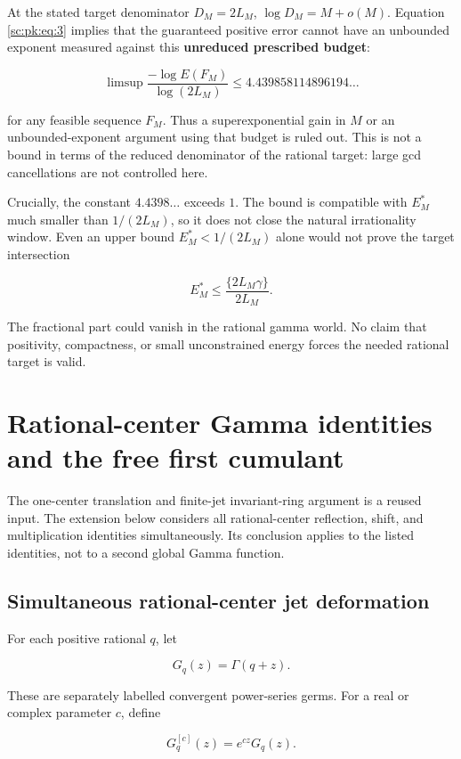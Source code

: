 \documentclass[11pt,a4paper]{article}
\theoremstyle{definition}
\theoremstyle{remark}
\theoremstyle{plain}
\numberwithin{equation}{section}
\begin{document}
At the stated target denominator $D_M=2L_M$, $\log D_M=M+o(M)$. Equation
\eqref{sc:pk:eq:3} implies that the guaranteed positive error cannot have an unbounded
exponent measured against this \textbf{unreduced prescribed budget}:

\[
\limsup\frac{-\log E(F_M)}{\log(2L_M)}\le4.439858114896194\ldots
\]

for any feasible sequence $F_M$. Thus a superexponential gain in $M$ or an
unbounded-exponent argument using that budget is ruled out. This is not
a bound in terms of the reduced denominator of the rational target:
large gcd cancellations are not controlled here.

Crucially, the constant $4.4398\ldots$ exceeds $1$. The bound is
compatible with $E_M^*$ much smaller than $1/(2L_M)$, so it does not
close the natural irrationality window. Even an upper bound
$E_M^*<1/(2L_M)$ alone would not prove the target
intersection

\[
E_M^*\le\frac{\{2L_M\gamma\}}{2L_M}.
\]

The fractional part could vanish in the rational gamma world. No claim
that positivity, compactness, or small unconstrained energy forces the
needed rational target is valid.

\section{Rational-center Gamma identities and the free first
cumulant}\label{sc:me:rational-center-gamma-identities-and-the-free-first-cumulant}

The one-center translation and finite-jet invariant-ring argument is a
reused input. The extension below considers all rational-center
reflection, shift, and multiplication identities simultaneously. Its
conclusion applies to the listed identities, not to a second global
Gamma function.

\subsection{Simultaneous rational-center jet
deformation}\label{sc:me:simultaneous-rational-center-jet-deformation}

For each positive rational \(q\), let

\[
G_q(z)=\Gamma(q+z).
\]

These are separately labelled convergent power-series germs. For a real
or complex parameter \(c\), define

\[
G_q^{[c]}(z)=e^{cz}G_q(z).
\tag{ME.2.1}\label{sc:me:eq:2.1}
\]
\end{document}
